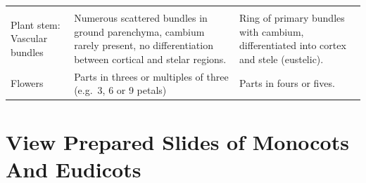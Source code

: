 \documentclass[]{book}
\theoremstyle{definition}
\theoremstyle{definition}
\theoremstyle{definition}
\theoremstyle{remark}
\begin{document}
\begin{longtable}[]{@{}lll@{}}
\begin{minipage}[t]{0.40\columnwidth}
\end{minipage}\tabularnewline
\begin{minipage}[t]{0.10\columnwidth}\raggedright\strut
Plant stem: Vascular bundles\strut
\end{minipage} & \begin{minipage}[t]{0.40\columnwidth}\raggedright\strut
Numerous scattered bundles in ground parenchyma, cambium rarely present,
no differentiation between cortical and stelar regions.\strut
\end{minipage} & \begin{minipage}[t]{0.40\columnwidth}\raggedright\strut
Ring of primary bundles with cambium, differentiated into cortex and
stele (eustelic).\strut
\end{minipage}\tabularnewline
\begin{minipage}[t]{0.10\columnwidth}\raggedright\strut
Flowers\strut
\end{minipage} & \begin{minipage}[t]{0.40\columnwidth}\raggedright\strut
Parts in threes or multiples of three (e.g.~3, 6 or 9 petals)\strut
\end{minipage} & \begin{minipage}[t]{0.40\columnwidth}\raggedright\strut
Parts in fours or fives.\strut
\end{minipage}\tabularnewline
\bottomrule
\end{longtable}

\section{View Prepared Slides of Monocots And
Eudicots}\label{view-prepared-slides-of-monocots-and-eudicots}
\end{document}
